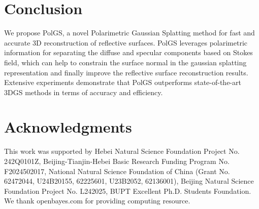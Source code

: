 \section{Conclusion}
We propose PolGS, a novel Polarimetric Gaussian Splatting method for fast and accurate 3D reconstruction of reflective surfaces. PolGS leverages polarimetric information for separating the diffuse and specular components based on Stokes field, which can help to constrain the surface normal in the gaussian splatting representation and finally improve the reflective surface reconstruction results.
Extensive experiments demonstrate that PolGS outperforms state-of-the-art 3DGS methods in terms of accuracy and efficiency.


\section*{Acknowledgments}
{
This work was supported by Hebei Natural Science Foundation Project No. 242Q0101Z, Beijing-Tianjin-Hebei Basic Research Funding Program No. F2024502017, National Natural Science Foundation of China (Grant No. 62472044, U24B20155, 62225601, U23B2052, 62136001), Beijing Natural Science Foundation Project No. L242025, BUPT Excellent Ph.D. Students Foundation. We thank openbayes.com for providing computing resource.}